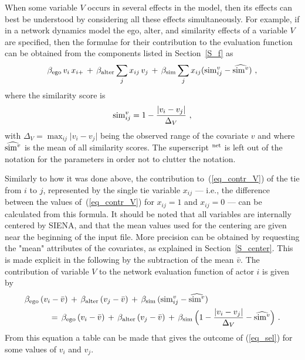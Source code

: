 \documentclass[a4paper,fleqn,11pt]{article}
\newcommand{\+}{\, + \,}
\newcommand{\si}{{\sf SIENA}}
\begin{document}
When some variable $V$ occurs in several effects in the model,
then its effects can best be understood
by considering all these effects simultaneously.
For example, if in a network dynamics model the
ego, alter, and similarity effects of a variable $V$ are specified,
then the formulae for their contribution
to the evaluation function can be obtained
from the components listed in Section~\ref{S_f} as
\begin{equation}
 \beta_{\rm ego}\, v_i \, x_{i+}
           \, + \, \beta_{\rm alter}  \sum_j x_{ij}\, v_j \, + \,
        \beta_{\rm sim}  \sum_j x_{ij}
                          ({\rm sim}^v_{ij} - \widehat{{\rm sim}^v}) \ ,
        \label{eq_contr_V}
\end{equation}
where the similarity score is
\[
{\rm sim}^v_{ij}= 1 - \frac{\vert v_i - v_j \vert}{\Delta_V} \ ,
\]
with
$\Delta_V=\max_{ij}\vert v_i - v_j \vert$ being
the observed range of the covariate $v$
and where $\widehat{{\rm sim}^v}$ is the mean of all similarity scores.
The superscript $^{\rm net}$ is left out of the notation for the parameters
in order not to clutter the notation.

Similarly to how it was done above, the contribution to~(\ref{eq_contr_V})
of the tie from $i$ to $j$, represented by the
single tie variable $x_{ij}$ --- i.e., the difference
between the values of~(\ref{eq_contr_V}) for $x_{ij}=1$
and $x_{ij}=0$  ---  can be calculated from this formula.
It should be noted that all variables are internally centered by \si,
and that the mean values used for the centering
are given near the beginning of the input file.
More precision can be obtained by requesting the \textsf{"mean"}
attributes of the covariates, as explained in
Section~\ref{S_center}.
This is made explicit in the following by the subtraction
of the mean $\bar v$. The contribution of variable $V$ to the
network evaluation function of actor $i$ is given by
\begin{align}
  &  \beta_{\rm ego}\, (v_i - \bar v)
                \, + \, \beta_{\rm alter}\,  (v_j - \bar v) \, + \,
   \beta_{\rm sim} \, ({\rm sim}^v_{ij} - \widehat{{\rm sim}^v} ) \nonumber \\
 & \hspace{3em} = \, \beta_{\rm ego}\, (v_i - \bar v)
              \, + \, \beta_{\rm alter}\,  (v_j - \bar v) \, + \,
        \beta_{\rm sim} \,  \Big( 1 - \frac{\vert v_i - v_j \vert}{\Delta_V}
                     - \widehat{{\rm sim}^v} \Big) \ .
                 \label{eq_sel}
\end{align}
From this equation a table can be made that gives the
outcome of (\ref{eq_sel}) for some values of $v_i$ and $v_j$.
\end{document}
